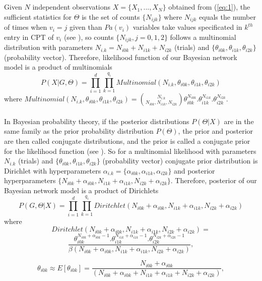 \documentclass{bmcart}
\begin{document}
\\
\\
Given $N$ independent observations $X=\{X_{1},...,X_{N}\}$ obtained from (\ref{eq:1}), the sufficient statistics for $\Theta$ is the set of counts $\{N_{ijk}\}$ where $N_{ijk}$ equals the number of times when $v_{i}=j$ given than $Pa(v_{i})$ variables take values specificated in $k^{th}$ entry in CPT of $v_{i}$ (see \cite{EllisAndWong2008}), so counts $\{N_{ijk},j=0,1,2\}$ follows a multinomial distribution with parameters $N_{i.k}=N_{i0k}+N_{i1k}+N_{i2k}$ (trials) and $\{\theta_{i0k},\theta_{i1k},\theta_{i2k}\}$ (probability vector). Therefore, likelihood function of our Bayesian network model is a product of multinomials
\begin{equation}
P\left(X|G,\Theta\right)=\prod_{i=1}^{d}\prod_{k=1}^{q_{i}}Multinomial(N_{i.k},\theta_{i0k},\theta_{i1k},\theta_{i2k})\label{eq:2}
\end{equation}
where $Multinomial(N_{i.k},\theta_{i0k},\theta_{i1k},\theta_{i2k})=\binom{N_{i.k}}{N_{i0k},N_{i1k},N_{i2k}}\theta_{i0k}^{N_{i0k}}.\theta_{i1k}^{N_{i1k}}.\theta_{i2k}^{N_{i2k}}$.\\
\\
In Bayesian probability theory, if the posterior distributions $P(\Theta|X)$ are in the same family as the prior probability distribution $P(\Theta)$, the prior and posterior are then called conjugate distributions, and the prior is called a conjugate prior for the likelihood function (see \cite{raiffa1961applied,bernardo2006bayesian,Gelman2003}). So for a multinomial likelihood with parameters $N_{i.k}$ (trials) and $\{\theta_{i0k},\theta_{i1k},\theta_{i2k}\}$ (probability vector) conjugate prior distribution is Dirichlet with hyperparameters $\alpha_{i.k}=\{\alpha_{i0k},\alpha_{i1k},\alpha_{i2k}\}$ and posterior hyperparameters $\{N_{i0k}+\alpha_{i0k},N_{i1k}+\alpha_{i1k},N_{i2k}+\alpha_{i2k}\}$. Therefore, posterior of our Bayesian network model is a product of Dirichlets
\begin{equation}
P(G,\Theta|X)=\prod_{i=1}^{d}\prod_{k=1}^{q_{i}}Diritchlet(N_{i0k}+\alpha_{i0k},N_{i1k}+\alpha_{i1k},N_{i2k}+\alpha_{i2k})\label{eq:3}
\end{equation}
where 
\[
Diritchlet(N_{i0k}+\alpha_{i0k},N_{i1k}+\alpha_{i1k},N_{i2k}+\alpha_{i2k})=
\]
\[
\frac{\theta_{i0k}^{N_{i0k}+\alpha_{i0k}-1}.\theta_{i1k}^{N_{i1k}+\alpha_{i1k}-1}.\theta_{i2k}^{N_{i2k}+\alpha_{i2k}-1}}{\beta(N_{i0k}+\alpha_{i0k},N_{i1k}+\alpha_{i1k},N_{i2k}+\alpha_{i2k})},
\]
 
\[
\theta_{i0k}\approx E[\theta_{i0k}]=\frac{N_{i0k}+\alpha_{i0k}}{(N_{i0k}+\alpha_{i0k}+N_{i1k}+\alpha_{i1k}+N_{i2k}+\alpha_{i2k})},
\]
 
\end{document}
